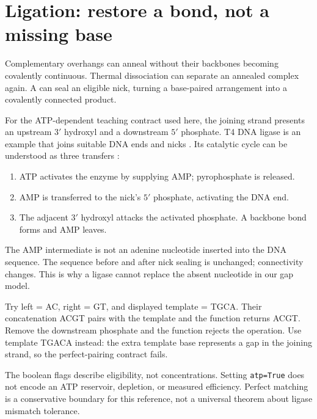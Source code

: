 \section{Ligation: restore a bond, not a missing base}

Complementary overhangs can anneal without their backbones becoming covalently continuous. Thermal dissociation can separate an annealed complex again. A  can seal an eligible nick, turning a base-paired arrangement into a covalently connected product.

For the ATP-dependent teaching contract used here, the joining strand presents an upstream $3'$ hydroxyl and a downstream $5'$ phosphate. T4 DNA ligase is an example that joins suitable DNA ends and nicks \cite{NEBT4Ligase}. Its catalytic cycle can be understood as three transfers \cite{Shi2018}:

\begin{enumerate}
\item ATP activates the enzyme by supplying AMP; pyrophosphate is released.
\item AMP is transferred to the nick's $5'$ phosphate, activating the DNA end.
\item The adjacent $3'$ hydroxyl attacks the activated phosphate. A backbone bond forms and AMP leaves.
\end{enumerate}


The AMP intermediate is not an adenine nucleotide inserted into the DNA sequence. The sequence before and after nick sealing is unchanged; connectivity changes. This is why a ligase cannot replace the absent nucleotide in our gap model.


Try left = AC, right = GT, and displayed template = TGCA. Their concatenation ACGT pairs with the template and the function returns ACGT. Remove the downstream phosphate and the function rejects the operation. Use template TGACA instead: the extra template base represents a gap in the joining strand, so the perfect-pairing contract fails.

The boolean flags describe eligibility, not concentrations. Setting \texttt{atp=True} does not encode an ATP reservoir, depletion, or measured efficiency. Perfect matching is a conservative boundary for this reference, not a universal theorem about ligase mismatch tolerance.

